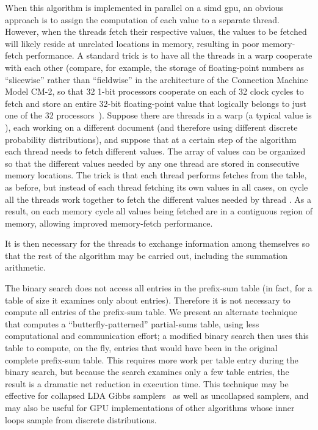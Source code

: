 \documentclass[10pt,nohyperref]{sigplanconf}
\begin{document}
When this algorithm is implemented in parallel on a {\sc simd} {\sc gpu}, an obvious approach is to assign the computation of each  value to a separate thread.
However, when the threads fetch their respective  values, the values to be fetched will likely reside at unrelated locations in memory, resulting in poor memory-fetch performance.  A standard trick is to have all the threads in a warp cooperate with each other (compare, for example, the storage of floating-point numbers as ``slicewise'' rather than ``fieldwise'' in the architecture of the Connection Machine Model CM-2, so that 32 1-bit processors cooperate on each of 32 clock cycles to fetch and store an entire 32-bit floating-point value that logically belongs to just one of the 32 processors~\cite{Johnsson-1989}).  Suppose there are  threads in a warp (a typical value is ), each working on a different document (and therefore using different discrete probability distributions), and suppose that at a certain step of the algorithm each thread needs to fetch  different  values.  The array of  values can be organized so that the  different  values needed by any one thread are stored in consecutive memory locations.  The trick is that each thread performs  fetches from the  table, as before, but instead of each thread fetching its own  values in all cases, on cycle  all the threads work together to fetch the  different  values needed by thread .  As a result, on each memory cycle all  values being fetched are in a contiguous region of memory,
allowing improved memory-fetch performance.

It is then necessary for the threads to exchange information among themselves so that the rest of the algorithm may be carried out, including the summation arithmetic.

The binary search does not access all entries in the prefix-sum table (in fact, for a table of size  it examines only about  entries).  Therefore it is not necessary to compute all entries of the prefix-sum table.  We present
an alternate technique that computes
a ``butterfly-patterned'' partial-sums table, using less computational and communication effort; a modified binary search then uses this table to compute, on the fly, entries that would have been in the original complete prefix-sum table.  This requires more work per table entry during the binary search, but because the search examines only a few table entries, the result is a dramatic net reduction in execution time.  This technique may be effective for collapsed LDA Gibbs samplers~\cite{yan_parallel_2009,lu_accelerating_2013,Augur}
as well as uncollapsed samplers, and may also be useful for GPU implementations of other algorithms \cite{zhao_same_2014}
whose inner loops sample from discrete distributions.
\end{document}
